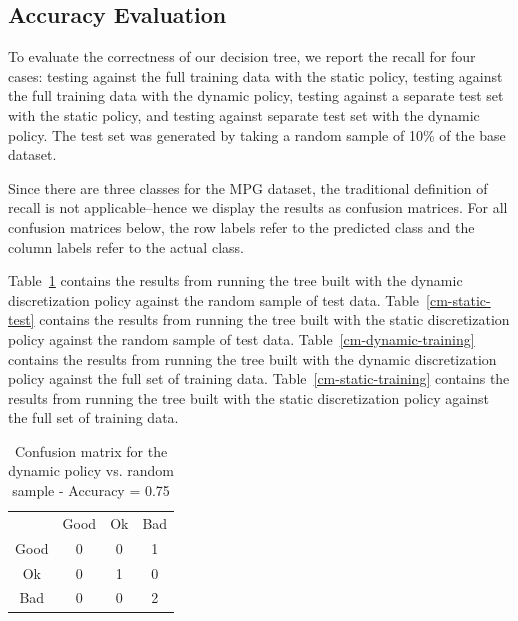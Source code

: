 \documentclass[12pt, conference, compsocconf]{IEEEtran}
\begin{document}
\subsection{Accuracy Evaluation}
To evaluate the correctness of our decision tree, we report the recall for four cases: testing against the full training data with the static policy, testing against the full training data with the dynamic policy, testing against a separate test set with the static policy, and testing against separate test set with the dynamic policy. 
The test set was generated by taking a random sample of 10\% of the base dataset. 

Since there are three classes for the MPG dataset, the traditional definition of recall is not applicable--hence we display the results as confusion matrices. 
For all confusion matrices below, the row labels refer to the predicted class and the column labels refer to the actual class.

Table~\ref{cm-dynamic-test} contains the results from running the tree built with the dynamic discretization policy against the random sample of test data. 
Table~\ref{cm-static-test} contains the results from running the tree built with the static discretization policy against the random sample of test data. 
Table~\ref{cm-dynamic-training} contains the results from running the tree built with the dynamic discretization policy against the full set of training data. 
Table~\ref{cm-static-training} contains the results from running the tree built with the static discretization policy against the full set of training data. 

\begin{table}[h!]
\centering
\begin{tabular}{cccc}
                          & Good                   & Ok                     & Bad                    \\ \cline{2-4} 
\multicolumn{1}{c|}{Good} & \multicolumn{1}{c|}{0} & \multicolumn{1}{c|}{0} & \multicolumn{1}{c|}{1} \\ \cline{2-4} 
\multicolumn{1}{c|}{Ok}   & \multicolumn{1}{c|}{0} & \multicolumn{1}{c|}{1} & \multicolumn{1}{c|}{0} \\ \cline{2-4} 
\multicolumn{1}{c|}{Bad}  & \multicolumn{1}{c|}{0} & \multicolumn{1}{c|}{0} & \multicolumn{1}{c|}{2} \\ \cline{2-4} 
\end{tabular}
\vspace{7pt}
\caption{Confusion matrix for the dynamic policy vs. random sample - Accuracy = 0.75}
\label{cm-dynamic-test}
\end{table}
\end{document}
